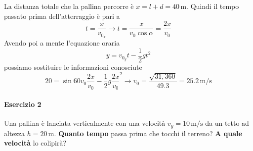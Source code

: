 \begin{center}
\end{center}

\divisor

La distanza totale che la pallina percorre è $x = l + d = 40\,\text{m}$. Quindi il tempo passato prima
dell'atterraggio è pari a 
\begin{equation*}
t = \frac{x}{v_{0_x}} \rightarrow t = \frac{x}{v_0\cos\alpha} = \frac{2x}{v_0}
\end{equation*}
Avendo poi a mente l'equazione oraria
\begin{equation*}
y = v_{0_y}t - \frac{1}{2}gt^2
\end{equation*}
possiamo sostituire le informazioni conosciute
\begin{equation*}
20 = \sin60v_0\frac{2x}{v_0} - \frac{1}{2}g\frac{2x}{v_0}^2 \rightarrow
v_0 = \frac{\sqrt{31,360}}{49.3} = \boxed{25.2\,\text{m/s}}
\end{equation*}

\paragraph{Esercizio 2}
Una pallina è lanciata verticalmente con una velocità $v_y = 10\,\text{m/s}$ da un tetto ad altezza
$h = 20\,\text{m}$. \textbf{Quanto tempo} passa prima che tocchi il terreno? \textbf{A quale velocità}
lo colipirà?

\divisor

